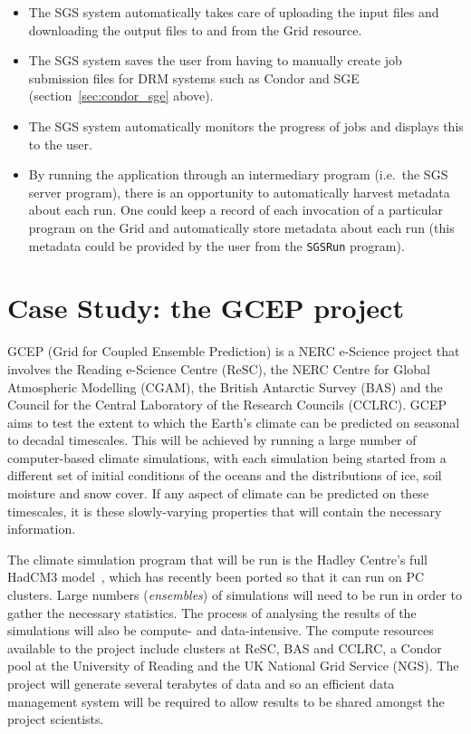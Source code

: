 \documentclass[a4paper]{article}
\begin{document}
\begin{multicols}{2}
\begin{itemize}
\item The SGS system automatically takes care of uploading the input files and downloading the output files to and from the Grid resource.
\item The SGS system saves the user from having to manually create job submission files for DRM systems such as Condor and SGE (section~\ref{sec:condor_sge} above).
\item The SGS system automatically monitors the progress of jobs and displays this to the user.
\item By running the application through an intermediary program (i.e.\ the SGS server program), there is an opportunity to automatically harvest metadata about each run.  One could keep a record of each invocation of a particular program on the Grid and automatically store metadata about each run (this metadata could be provided by the user from the {\tt SGSRun} program).
\end{itemize}

\section{Case Study: the GCEP project}
GCEP (Grid for Coupled Ensemble Prediction) is a NERC e-Science project that involves the Reading e-Science Centre (ReSC), the NERC Centre for Global Atmospheric Modelling (CGAM), the British Antarctic Survey (BAS) and the Council for the Central Laboratory of the Research Councils (CCLRC).  GCEP aims to test the extent to which the Earth's climate can be predicted on seasonal to decadal timescales.  This will be achieved by running a large number of computer-based climate simulations, with each simulation being started from a different set of initial conditions of the oceans and the distributions of ice, soil moisture and snow cover.  If any aspect of climate can be predicted on these timescales, it is these slowly-varying properties that will contain the necessary information.

The climate simulation program that will be run is the Hadley Centre's full HadCM3 model~\cite{hadcm3}, which has recently been ported so that it can run on PC clusters.  Large numbers ({\em ensembles\/}) of simulations will need to be run in order to gather the necessary statistics.  The process of analysing the results of the simulations will also be compute- and data-intensive.  The compute resources available to the project include clusters at ReSC, BAS and CCLRC, a Condor pool at the University of Reading and the UK National Grid Service (NGS).  The project will generate several terabytes of data and so an efficient data management system will be required to allow results to be shared amongst the project scientists.


\end{multicols}
\end{document}
